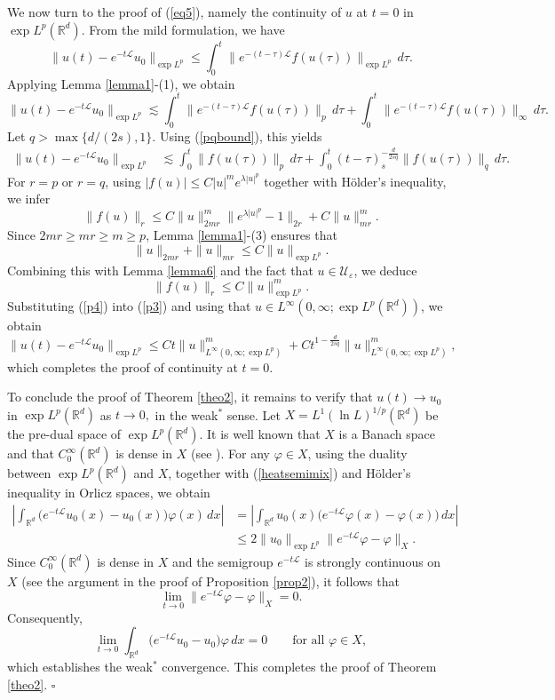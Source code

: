 \documentclass[a4paper,11pt]{amsart}
\renewcommand\eqref[1]{(\ref{#1})} %
\numberwithin{equation}{section}
\theoremstyle{plain}
\theoremstyle{definition}
\begin{document}
We now turn to the proof of \eqref{eq5}, namely the continuity of $u$ at $t=0$ in $\exp L^p(\mathbb{R}^d)$.
From the mild formulation, we have
$$
\|u(t)-e^{-t\mathcal{L}}u_0\|_{\exp L^p}
\le
\int_0^t
\|e^{-(t-\tau)\mathcal{L}}f(u(\tau))\|_{\exp L^p}
\,d\tau .
$$
Applying Lemma \ref{lemma1}-(1), we obtain
$$
\|u(t)-e^{-t\mathcal{L}}u_0\|_{\exp L^p}\lesssim
\int_0^t
\|e^{-(t-\tau)\mathcal{L}}f(u(\tau))\|_{p}\,d\tau
+\int_0^t
\|e^{-(t-\tau)\mathcal{L}}f(u(\tau))\|_{\infty}\,d\tau.
$$
Let $q>\max\{d/(2s),1\}$. 
Using \eqref{pqbound}, this yields
\begin{align}
\|u(t)-e^{-t\mathcal{L}}u_0\|_{\exp L^p}
&\lesssim\int_0^t
\|f(u(\tau))\|_{p}\,d\tau+\int_0^t
(t-\tau)_s^{-\frac{d}{2sq}}
\|f(u(\tau))\|_{q}\,d\tau .
\label{p3}
\end{align}
For $r=p$ or $r=q$, using
$
|f(u)|
\le C|u|^m e^{\lambda |u|^p}$ together with H\"older's inequality, we infer
\[
\|f(u)\|_{r}
\le
C \|u\|_{2mr}^m
\|e^{\lambda |u|^p}-1\|_{2r}
+ C \|u\|_{mr}^m.
\]
Since $2mr\ge mr\ge m\ge p$, Lemma \ref{lemma1}-(3) ensures that
\[
\|u\|_{2mr}+\|u\|_{mr}
\le C \|u\|_{\exp L^p}.
\]
Combining this with Lemma \ref{lemma6} and the fact that $u\in \mathcal{U}_\varepsilon$, we deduce
\begin{equation}
\|f(u)\|_{r}
\le C\|u\|_{\exp L^p}^m.
\label{p4}
\end{equation}
Substituting \eqref{p4} into \eqref{p3} and using that $u\in L^\infty(0,\infty;\exp L^p(\mathbb{R}^d))$, we obtain
\[
\|u(t)-e^{-t\mathcal{L}}u_0\|_{\exp L^p}
\le
C t \|u\|_{L^\infty(0,\infty;\exp L^p)}^m
+
C t^{1-\frac{d}{2sq}}
\|u\|_{L^\infty(0,\infty;\exp L^p)}^m,
\]
which completes the proof of continuity at $t=0$.

To conclude the proof of Theorem \ref{theo2}, it remains to verify that $u(t) \rightarrow u_0$ 
in $\exp L^p(\mathbb{R}^d)$ as $ t \to 0,$ in the weak$^{*}$ sense. Let $X = L^1(\ln L)^{1/p}(\mathbb{R}^d)$ be the pre-dual space of 
$\exp L^p(\mathbb{R}^d)$. 
It is well known that $X$ is a Banach space and that $C_0^\infty(\mathbb{R}^d)$ is dense in $X$ 
(see \cite{Adams}). For any $\varphi \in X$, using the duality between $\exp L^p(\mathbb{R}^d)$ and $X$, together with \eqref{heatsemimix} and H\"older's inequality in Orlicz spaces, we obtain
\begin{align*}
\left|
\int_{\mathbb{R}^d}
\bigl(e^{-t\mathcal{L}}u_0(x)-u_0(x)\bigr)\varphi(x)\,dx
\right|
&=
\left|
\int_{\mathbb{R}^d}
u_0(x)\bigl(e^{-t\mathcal{L}}\varphi(x)-\varphi(x)\bigr)\,dx
\right| \\
&\le
2\|u_0\|_{\exp L^p}
\|e^{-t\mathcal{L}}\varphi-\varphi\|_X.
\end{align*}
Since $C_0^\infty(\mathbb{R}^d)$ is dense in $X$ and the semigroup
$e^{-t\mathcal{L}}$ is strongly continuous on $X$ 
(see the argument in the proof of Proposition \ref{prop2}), it follows that
\[
\lim_{t\to 0}
\|e^{-t\mathcal{L}}\varphi-\varphi\|_X=0.
\]
Consequently,
\[
\lim_{t\to 0}
\int_{\mathbb{R}^d}
\bigl(e^{-t\mathcal{L}}u_0-u_0\bigr)\varphi\,dx
=0
\qquad \text{for all } \varphi\in X,
\]
which establishes the weak$^{*}$ convergence. This completes the proof of Theorem  \ref{theo2}.
\hfill $\square$
\end{document}
